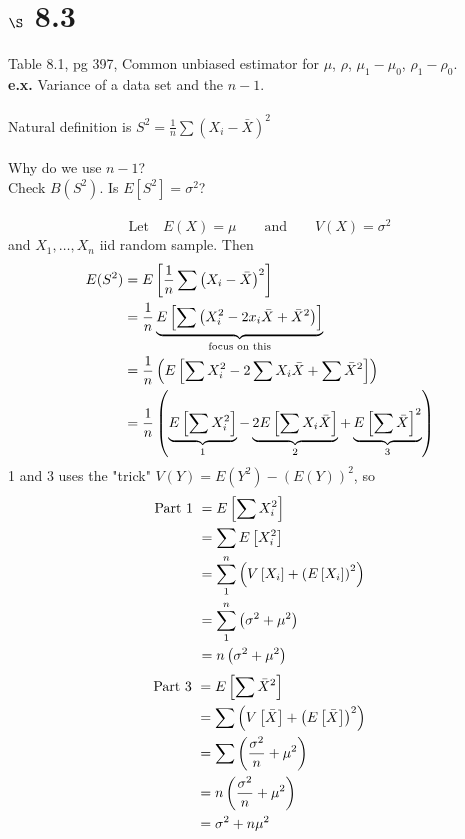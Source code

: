 \documentclass[12pt]{article}
\newcommand{\pars}[1]{\left( {#1} \right) }
\newcommand{\brac}[1]{\left[ {#1} \right] }
\newcommand{\xbar}{\bar{X}}
\renewcommand{\over}[1]{\frac{1}{{#1}}}
\begin{document}
\section*{$\S$ 8.3}
Table 8.1, pg 397, Common unbiased estimator for $\mu$, $\rho$, $\mu_1 - \mu_0$, $\rho_1 - \rho_0$.
\vspace{0.25in}\\
\textbf{e.x.} Variance of a data set and the $n-1$.\\\\
Natural definition is $S^2 = \over{n} \sum \pars{X_i-\xbar}^2$\\\\
Why do we use $n-1$?\\
Check $B(S^2)$. Is $E[S^2] = \sigma^2$?\\\\
$$\text{Let} \quad E(X) = \mu \qquad \text{and}\qquad V(X) = \sigma^2$$
and $X_1, \dots, X_n$ iid random sample. Then
\begin{align}
    E(S^2) &= E\brac{\over{n}\sum \pars{X_i - \xbar}^2} \notag\\
    &= \over{n}\underbrace{E\brac{\sum \pars{X_i^2 - 2x_i\xbar + \xbar ^2}}}_{\text{focus on this}}\notag\\
    &= \over{n}\pars{E\brac{\sum X_i^2 - 2\sum X_i\xbar + \sum \xbar^2}}\notag\\
    &= \over{n}\pars{\underbrace{E\brac{\sum X_i^2}}_1 - \underbrace{2E\brac{\sum X_i\xbar}}_2 + \underbrace{E\brac{\sum \xbar}^2}_3} \notag
\end{align}
    1 and 3 uses the "trick" $V(Y) = E(Y^2) - (E(Y))^2$, so
\begin{align}
    \text{Part 1 } &= E\brac{\sum X_i^2} \notag\\ 
    &= \sum E\brac{X_i^2}\notag\\
    &= \sum_1^n \pars{V\brac{X_i} + \pars{E\brac{X_i}}^2}\notag\\
    &= \sum_1^n \pars{\sigma^2 + \mu^2} \notag\\
    &= n\pars{\sigma^2 + \mu^2}\notag
\end{align}
\begin{align}
    \text{Part 3 } &= E\brac{\sum \xbar^2} \notag\\
    &= \sum \pars{V\brac{\xbar} + \pars{E\brac{\xbar}}^2}\notag\\
    &= \sum \pars{\frac{\sigma^2}{n} + \mu^2}\notag\\ %
    &= n \pars{\frac{\sigma^2}{n} + \mu^2} \notag\\
    &= \sigma^2 + n \mu^2\notag
\end{align}
\end{document}
